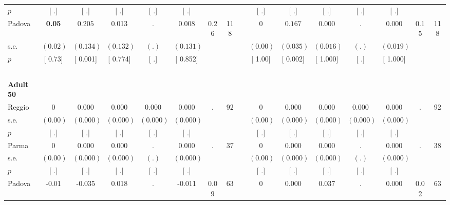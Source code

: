 \begin{longtable}{L{8em} c c c c c c c p{1em} c c c c c c c}
\quad \quad \quad \quad $ p$ & [        .] & [        .] & [        .] & [        .] & [        .] & & & & [        .] & [        .] & [        .] & [        .] & [        .] & &  \\[1em]
\quad \quad \quad Padova& \textbf{     0.05} & $ \mathbf{    0.205}$ &     0.013 &         . &     0.008 &      0.26 &       118 & & 0 & $ \mathbf{    0.167}$ &     0.000 &         . &     0.000 &      0.15 &       118  \\*
\quad \quad \quad \quad s.e.& $ (     0.02)$ & $ (    0.134)$ & $ (    0.132)$ & $ (        .)$ & $ (    0.131)$ & & & & $ (     0.00)$ & $ (    0.035)$ & $ (    0.016)$ & $ (        .)$ & $ (    0.019)$ & &  \\*
\quad \quad \quad \quad $ p$ & [     0.73] & [    0.001] & [    0.774] & [        .] & [    0.852] & & & & [     1.00] & [    0.002] & [    1.000] & [        .] & [    1.000] & &  \\[1em]
~\\[1em]
\quad \quad \textbf{Adult 50} & & & & & & & & & & & & & & & \\* 
\quad \quad \quad Reggio& 0 &     0.000 &     0.000 &     0.000 &     0.000 &         . &        92 & & 0 &     0.000 &     0.000 &     0.000 &     0.000 &         . &        92  \\*
\quad \quad \quad \quad s.e.& $ (     0.00)$ & $ (    0.000)$ & $ (    0.000)$ & $ (    0.000)$ & $ (    0.000)$ & & & & $ (     0.00)$ & $ (    0.000)$ & $ (    0.000)$ & $ (    0.000)$ & $ (    0.000)$ & &  \\*
\quad \quad \quad \quad $ p$ & [        .] & [        .] & [        .] & [        .] & [        .] & & & & [        .] & [        .] & [        .] & [        .] & [        .] & &  \\[1em]
\quad \quad \quad Parma& 0 &     0.000 &     0.000 &         . &     0.000 &         . &        37 & & 0 &     0.000 &     0.000 &         . &     0.000 &         . &        38  \\*
\quad \quad \quad \quad s.e.& $ (     0.00)$ & $ (    0.000)$ & $ (    0.000)$ & $ (        .)$ & $ (    0.000)$ & & & & $ (     0.00)$ & $ (    0.000)$ & $ (    0.000)$ & $ (        .)$ & $ (    0.000)$ & &  \\*
\quad \quad \quad \quad $ p$ & [        .] & [        .] & [        .] & [        .] & [        .] & & & & [        .] & [        .] & [        .] & [        .] & [        .] & &  \\[1em]
\quad \quad \quad Padova& -0.01 &    -0.035 &     0.018 &         . &    -0.011 &      0.09 &        63 & & 0 &     0.000 &     0.037 &         . &     0.000 &      0.02 &        63  \\*

\end{longtable}
